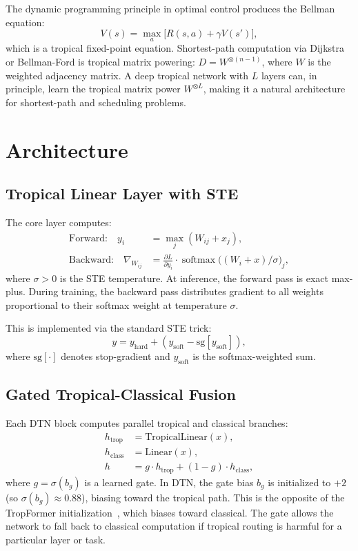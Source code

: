 \documentclass[11pt,twocolumn]{article}
\newcommand{\tropmult}{\otimes}
\newcommand{\softmax}{\operatorname{softmax}}
\begin{document}
The dynamic programming principle in optimal control produces the Bellman
equation:
\begin{equation}\label{eq:bellman}
  V(s) = \max_a \bigl[ R(s,a) + \gamma V(s') \bigr],
\end{equation}
which is a tropical fixed-point equation. Shortest-path computation via
Dijkstra or Bellman-Ford is tropical matrix powering:
$D = W^{\tropmult(n-1)}$, where $W$ is the weighted adjacency matrix.
A deep tropical network with $L$ layers can, in principle, learn the tropical
matrix power $W^{\tropmult L}$, making it a natural architecture for
shortest-path and scheduling problems.

\section{Architecture}\label{sec:architecture}

\subsection{Tropical Linear Layer with STE}

The core layer computes:
\begin{align}
  \text{Forward:} \quad y_i &= \max_j(W_{ij} + x_j), \\
  \text{Backward:} \quad \nabla_{W_{ij}} &= \frac{\partial L}{\partial y_i}
    \cdot \softmax\bigl((W_i + x)/\sigma\bigr)_j,
\end{align}
where $\sigma > 0$ is the STE temperature. At inference, the forward pass
is exact max-plus. During training, the backward pass distributes gradient
to all weights proportional to their softmax weight at temperature $\sigma$.

This is implemented via the standard STE trick:
\begin{equation}
  y = y_\text{hard} + (y_\text{soft} - \text{sg}[y_\text{soft}]),
\end{equation}
where $\text{sg}[\cdot]$ denotes stop-gradient and $y_\text{soft}$ is the
softmax-weighted sum.

\subsection{Gated Tropical-Classical Fusion}

Each DTN block computes parallel tropical and classical branches:
\begin{align}
  h_\text{trop} &= \text{TropicalLinear}(x), \\
  h_\text{class} &= \text{Linear}(x), \\
  h &= g \cdot h_\text{trop} + (1 - g) \cdot h_\text{class},
\end{align}
where $g = \sigma(b_g)$ is a learned gate. In DTN, the gate bias $b_g$ is
initialized to $+2$ (so $\sigma(b_g) \approx 0.88$), biasing toward the
tropical path. This is the opposite of the TropFormer
initialization~\cite{tropformer2025}, which biases toward classical. The
gate allows the network to fall back to classical computation if tropical
routing is harmful for a particular layer or task.
\end{document}
